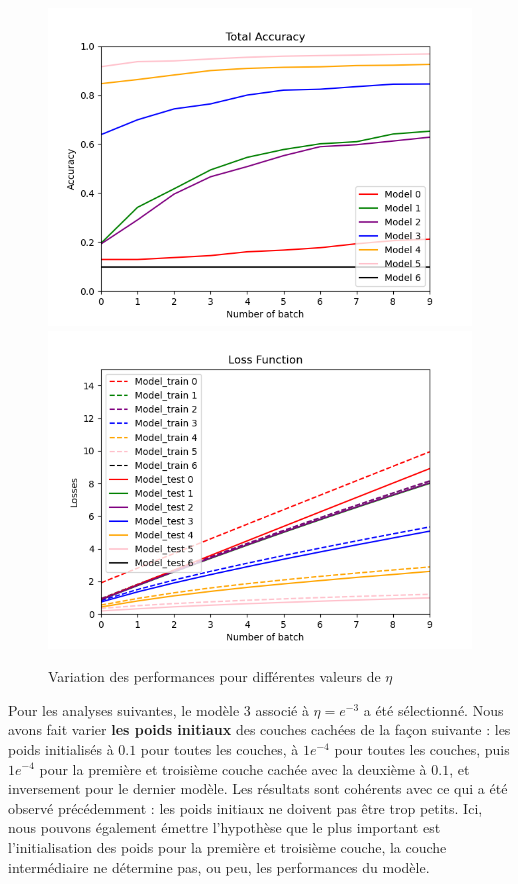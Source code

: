 \documentclass[a4paper]{article}
\begin{document}
		\begin{figure}[!ht]
			\centering
			\includegraphics[width=.5\textwidth]{Fig_acc_p3.png}\hfill
			\includegraphics[width=.5\textwidth]{Fig_losses_p3.png}\hfill
			\caption{Variation des performances pour différentes valeurs de $\eta$}	
		\end{figure}
		
	\newpage
	Pour les analyses suivantes, le modèle 3 associé à $\eta = e^{-3}$ a été sélectionné. Nous avons fait varier \textbf{les poids initiaux} des couches cachées de la façon suivante : les poids initialisés à $0.1$ pour toutes les couches, à $1e^{-4}$ pour toutes les couches, puis $1e^{-4}$ pour la première et troisième couche cachée avec la deuxième à $0.1$, et inversement pour le dernier modèle.
Les résultats sont cohérents avec ce qui a été observé précédemment : les poids initiaux ne doivent pas être trop petits. Ici, nous pouvons également émettre l'hypothèse que le plus important est l'initialisation des poids pour la première et troisième couche, la couche intermédiaire ne détermine pas, ou peu, les performances du modèle.\\
		
\end{document}
